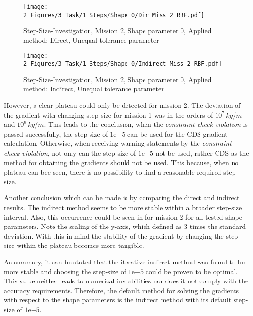 \begin{figure}[!h]
    \centering
    \texttt{[image: 2\_Figures/3\_Task/1\_Steps/Shape\_0/Dir\_Miss\_2\_RBF.pdf]}
    \caption{Step-Size-Investigation, Mission 2, Shape parameter $0$, Applied method: Direct, Unequal tolerance parameter}
    \label{fig_16}
\end{figure}


\begin{figure}[!h]
    \centering
    \texttt{[image: 2\_Figures/3\_Task/1\_Steps/Shape\_0/Indirect\_Miss\_2\_RBF.pdf]}
    \caption{Step-Size-Investigation, Mission 2, Shape parameter $0$, Applied method: Indirect, Unequal tolerance parameter}
    \label{fig_17}
\end{figure}

\FloatBarrier
However, a clear plateau could only 
be detected for mission 2. The deviation 
of the gradient with changing step-size
for mission 1 
was in the orders of $10^7 \,  kg/m$ and  $10^9\, kg/m$. 
This leads to the conclusion, when 
the \emph{constraint check violation} is 
passed successfully, the step-size 
of $1\mathrm{e}{-5}$ can be used for 
the CDS gradient calculation. Otherwise, when 
receiving warning statements by the 
\emph{constraint check violation}, 
not only can the step-size of $1\mathrm{e}{-5}$ 
not be used, rather CDS as the method 
for obtaining the gradients should not 
be used. This because, when no plateau can 
bee seen, there is no possibility to find 
a reasonable required step-size.\newline


Another conclusion which can be made is 
by comparing the direct and indirect 
results. The 
indirect method seems to be more 
stable within a broader step-size interval.
Also, this occurrence could be seen in 
for mission 2 for all tested shape parameters.
Note the scaling of the y-axis, which 
defined as 3 times the standard deviation. With this 
in mind the stability 
of the gradient by changing the step-size 
within the plateau becomes more tangible.\newline 

As summary, it can be stated that
the iterative indirect method was found 
to be more stable and choosing 
the step-size of $1\mathrm{e}{-5}$
could be proven to be optimal. This value
neither leads to numerical 
instabilities nor does it not comply 
with the accuracy requirements. Therefore,
the default method for solving 
the gradients with respect to the shape 
parameters is the indirect 
method with its default step-size of 
$1\mathrm{e}{-5}$.
